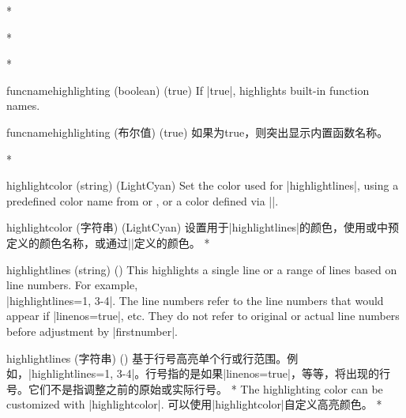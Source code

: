 \begin{optionlist} 
\begin{paracol}{2}

 



\switchcolumn[0]*%

    
\switchcolumn

\switchcolumn[0]*%
  







 


\switchcolumn[0]*%
  \item[funcnamehighlighting (boolean) (true)] 
    If |true|, highlights built-in function names.
    \switchcolumn
    \item[funcnamehighlighting (布尔值) (true)] 
    如果为true，则突出显示内置函数名称。

    \switchcolumn[0]*%
\item[highlightcolor (string) (LightCyan)]
Set the color used for |highlightlines|, using a predefined color name from  or , or a color defined via |\definecolor|.
\switchcolumn
\item[highlightcolor (字符串) (LightCyan)]
设置用于|highlightlines|的颜色，使用或中预定义的颜色名称，或通过|\definecolor|定义的颜色。
\switchcolumn[0]*%

\item[highlightlines (string) (\meta{none})]
This highlights a single line or a range of lines based on line numbers.  For example, \\|highlightlines={1, 3-4}|.  The line numbers refer to the line numbers that would appear if |linenos=true|, etc.  They do not refer to original or actual line numbers before adjustment by |firstnumber|.
\switchcolumn
\item[highlightlines (字符串) (\meta{无})]
基于行号高亮单个行或行范围。例如，|highlightlines={1, 3-4}|。行号指的是如果|linenos=true|，等等，将出现的行号。它们不是指调整之前的原始或实际行号。
\switchcolumn[0]*%
The highlighting color can be customized with |highlightcolor|.
\switchcolumn
可以使用|highlightcolor|自定义高亮颜色。
\switchcolumn[0]*%


\end{paracol}
\end{optionlist}
